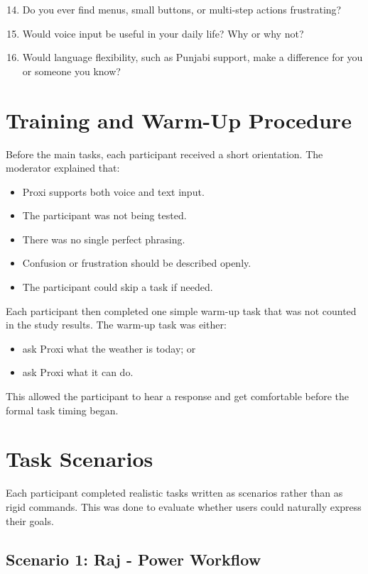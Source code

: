 \documentclass[12pt, titlepage]{article}
\begin{document}
\begin{enumerate}[label=\arabic*.]
    \setcounter{enumi}{13}
    \item Do you ever find menus, small buttons, or multi-step actions
    frustrating?
    \item Would voice input be useful in your daily life? Why or why
    not?
    \item Would language flexibility, such as Punjabi support, make a
    difference for you or someone you know?
\end{enumerate}

\section{Training and Warm-Up Procedure}

Before the main tasks, each participant received a short orientation.
The moderator explained that:
\begin{itemize}
    \item Proxi supports both voice and text input.
    \item The participant was not being tested.
    \item There was no single perfect phrasing.
    \item Confusion or frustration should be described openly.
    \item The participant could skip a task if needed.
\end{itemize}

Each participant then completed one simple warm-up task that was not
counted in the study results. The warm-up task was either:
\begin{itemize}
    \item ask Proxi what the weather is today; or
    \item ask Proxi what it can do.
\end{itemize}

This allowed the participant to hear a response and get comfortable
before the formal task timing began.

\section{Task Scenarios}

Each participant completed realistic tasks written as scenarios rather
than as rigid commands. This was done to evaluate whether users could
naturally express their goals.

\subsection{Scenario 1: Raj - Power Workflow}
\end{document}
